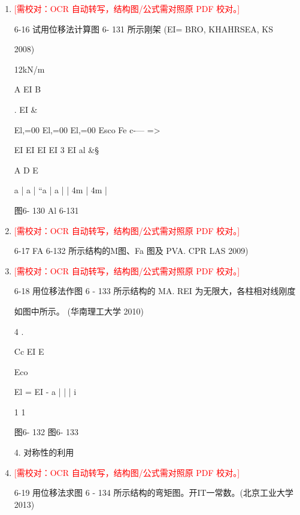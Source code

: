 \documentclass[UTF8,12pt,a4paper,openany]{ctexbook}
\newcommand{\TODO}[1]{\textcolor{red}{[需校对：#1]}}
\begin{document}
\begin{enumerate}[label=\textbf{\arabic*.},leftmargin=2em]
\item \TODO{OCR 自动转写，结构图/公式需对照原 PDF 校对。}\par 6-16 试用位移法计算图 6- 131 所示刚架 (EI= BRO, KHAHRSEA, KS\par 2008)\par 12kN/m\par A   EI      B\par .                           EI                 \&\par El,=00      El,=00       El,=00       Esco Fe                           c-— =>\par EI          EI          EI          EI        3                        EI           al \&§\par A                                                                 D              E\par a     |     a     |    “a     |     a     |                      |     4m     |     4m     |\par 图6- 130                                                          Al 6-131
\item \TODO{OCR 自动转写，结构图/公式需对照原 PDF 校对。}\par 6-17 FA 6-132 所示结构的M图、Fa 图及 PVA. CPR LAS 2009)
\item \TODO{OCR 自动转写，结构图/公式需对照原 PDF 校对。}\par 6-18 用位移法作图 6 - 133 所示结构的 MA. REI 为无限大，各柱相对线刚度\par 如图中所示。 (华南理工大学 2010)\par 4                     .\par Cc     EI        E\par Eco\par El     =    EI    -           a        |        |      |   i\par 1        1\par 图6- 132                                                        图6- 133\par 4. 对称性的利用
\item \TODO{OCR 自动转写，结构图/公式需对照原 PDF 校对。}\par 6-19 用位移法求图 6 - 134 所示结构的弯矩图。开IT一常数。(北京工业大学 2013)

\end{enumerate}
\end{document}
